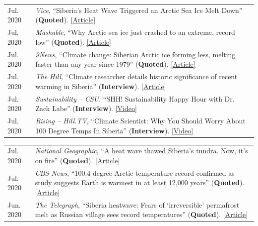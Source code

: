 \documentclass[margin,line,palatino,courier,10pt]{res}
\begin{document}
\begin{resume}
\begin{tabular}{@{}p{0.9in}p{4in}}
Jul. 2020 & \textit{Vice}, ``Siberia's Heat Wave Triggered an Arctic Sea Ice Melt Down'' (\textbf{Quoted}). \href{https://www.vice.com/en_us/article/ep45be/siberias-heat-wave-triggered-an-arctic-sea-ice-melt-down}{[Article]}\\
Jul. 2020 & \textit{Mashable}, ``Why Arctic sea ice just crashed to an extreme, record low'' (\textbf{Quoted}). \href{https://mashable.com/article/arctic-sea-ice-plummets-2020/}{[Article]}\\
Jul. 2020 & \textit{9News}, ``Climate change: Siberian Arctic ice forming less, melting faster than any year since 1979'' (\textbf{Quoted}). \href{https://www.9news.com.au/world/climate-change-global-warming-siberian-heatwave-arctic-ice-melting-faster-us-research-data/}{[Article]}\\
Jul. 2020 & \textit{The Hill}, ``Climate researcher details historic significance of recent warming in Siberia'' (\textbf{Interview}). \href{https://thehill.com/hilltv/rising/507850-climate-researcher-details-historic-significance-of-recent-warming-in-siberia}{[Article]}\\
Jul. 2020 & \textit{Sustainability -- CSU}, ``SHH! Sustainability Happy Hour with Dr. Zack Labe'' (\textbf{Interview}). \href{https://www.youtube.com/watch?v=E6htTPoeXQ8&feature=youtu.be}{[Video]}\\
Jul. 2020 & \textit{Rising -- Hill.TV}, ``Climate Scientist: Why You Should Worry About 100 Degree Temps In Siberia'' (\textbf{Interview}). \href{https://www.youtube.com/watch?v=fw4fG-_aI28&feature=youtu.be}{[Video]}\\
\end{tabular}
\begin{tabular}{@{}p{0.9in}p{4in}}
Jul. 2020 & \textit{National Geographic}, ``A heat wave thawed Siberia’s tundra. Now, it’s on fire'' (\textbf{Quoted}). \href{https://www.nationalgeographic.com/science/2020/07/heat-wave-thawed-siberia-now-on-fire/#close}{[Article]}\\
Jul. 2020 & \textit{CBS News}, ``100.4 degree Arctic temperature record confirmed as study suggests Earth is warmest in at least 12,000 years'' (\textbf{Quoted}). \href{https://www.cbsnews.com/news/arctic-temperature-record-100-4-degrees-earth-warmest-12000-years/}{[Article]}\\
Jun. 2020 & \textit{The Telegraph}, ``Siberia heatwave: Fears of `irreversible' permafrost melt as Russian village sees record temperatures'' (\textbf{Quoted}). \href{https://www.telegraph.co.uk/news/2020/06/26/siberia-heatwave-fears-irreversible-permafrost-meltas-russian/}{[Article]}\\

\end{tabular}
\end{resume}
\end{document}
